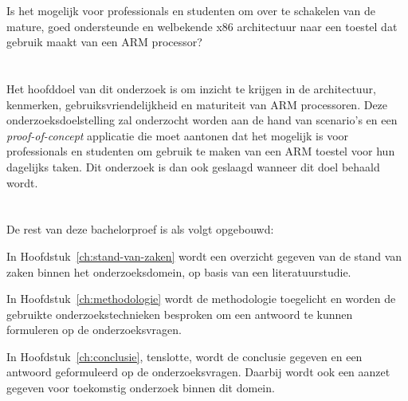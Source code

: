 Is het mogelijk voor professionals en studenten om over te schakelen van de mature, goed ondersteunde en welbekende x86 architectuur naar een toestel dat gebruik maakt van een ARM processor? 

\section{}
\label{sec:onderzoeksdoelstelling}

Het hoofddoel van dit onderzoek is om inzicht te krijgen in de architectuur, kenmerken, gebruiksvriendelijkheid en maturiteit van ARM processoren. Deze onderzoeksdoelstelling zal onderzocht worden aan de hand van scenario’s en een \textit{proof-of-concept} applicatie die moet aantonen dat het mogelijk is voor professionals en studenten om gebruik te maken van een ARM toestel voor hun dagelijks taken. Dit onderzoek is dan ook geslaagd wanneer dit doel behaald wordt.

\newpage
\section{}
\label{sec:opzet-bachelorproef}


De rest van deze bachelorproef is als volgt opgebouwd:

In Hoofdstuk~\ref{ch:stand-van-zaken} wordt een overzicht gegeven van de stand van zaken binnen het onderzoeksdomein, op basis van een literatuurstudie.

In Hoofdstuk~\ref{ch:methodologie} wordt de methodologie toegelicht en worden de gebruikte onderzoekstechnieken besproken om een antwoord te kunnen formuleren op de onderzoeksvragen.


In Hoofdstuk~\ref{ch:conclusie}, tenslotte, wordt de conclusie gegeven en een antwoord geformuleerd op de onderzoeksvragen. Daarbij wordt ook een aanzet gegeven voor toekomstig onderzoek binnen dit domein.